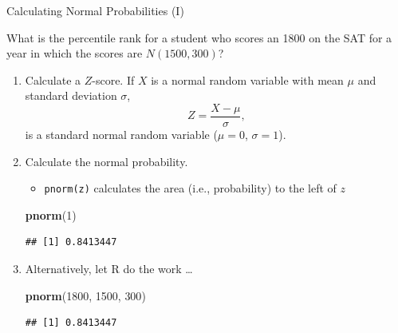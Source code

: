 \documentclass[ignorenonframetext,aspectratio=169]{beamer}
\newenvironment{Shaded}{\begin{snugshade}}{\end{snugshade}}
\newcommand{\KeywordTok}[1]{\textcolor[rgb]{0.13,0.29,0.53}{\textbf{#1}}}
\newcommand{\DecValTok}[1]{\textcolor[rgb]{0.00,0.00,0.81}{#1}}
\newcommand{\NormalTok}[1]{#1}
\providecommand{\tightlist}{%
  \setlength{\itemsep}{0pt}\setlength{\parskip}{0pt}}
\begin{document}
\begin{frame}[fragile]{Calculating Normal Probabilities (I)}

What is the percentile rank for a student who scores an 1800 on the SAT
for a year in which the scores are \(N(1500, 300)\)?

\footnotesize

\begin{enumerate}
\def\labelenumi{\arabic{enumi}.}
\item
  Calculate a \(Z\)-score. If \(X\) is a normal random variable with
  mean \(\mu\) and standard deviation \(\sigma\),
  \[Z = \frac{X - \mu}{\sigma},  \] is a standard normal random variable
  (\(\mu = 0\), \(\sigma =1\)).
\item
  Calculate the normal probability.

  \begin{itemize}
  \tightlist
  \item
    \texttt{pnorm(z)} calculates the area (i.e., probability) to the
    left of \(z\)
  \end{itemize}

\begin{Shaded}
\begin{Highlighting}[]
\KeywordTok{pnorm}\NormalTok{(}\DecValTok{1}\NormalTok{)}
\end{Highlighting}
\end{Shaded}

\begin{verbatim}
## [1] 0.8413447
\end{verbatim}
\item
  Alternatively, let \textsf{R} do the work \ldots{}

\begin{Shaded}
\begin{Highlighting}[]
\KeywordTok{pnorm}\NormalTok{(}\DecValTok{1800}\NormalTok{, }\DecValTok{1500}\NormalTok{, }\DecValTok{300}\NormalTok{)}
\end{Highlighting}
\end{Shaded}

\begin{verbatim}
## [1] 0.8413447
\end{verbatim}
\end{enumerate}

\end{frame}
\end{document}
